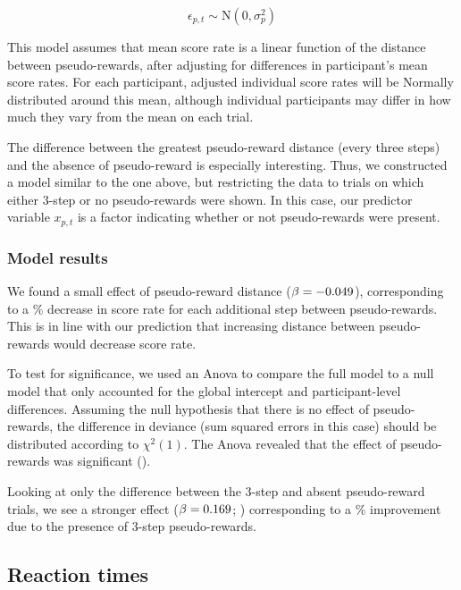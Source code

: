 \documentclass[10pt,letterpaper]{article}
\begin{document}
\begin{equation}
    \epsilon_{p,t} \sim \text{N}(0, \sigma^2_p)
\end{equation}

This model assumes that mean score rate is a linear function of the distance between pseudo-rewards, after adjusting for differences in participant's mean score rates. For each participant, adjusted individual score rates will be Normally distributed around this mean, although individual participants may differ in how much they vary from the mean on each trial.

The difference between the greatest pseudo-reward distance (every three steps) and the absence of pseudo-reward is especially interesting. Thus, we constructed a model similar to the one above, but restricting the data to trials on which either 3-step or no pseudo-rewards were shown. In this case, our predictor variable $x_{p,t}$ is a factor indicating whether or not pseudo-rewards were present.


\subsubsection{Model results} %

We found a small effect of pseudo-reward distance ($\beta = -0.049$), corresponding to a \WorsenRate\% decrease in score rate for each additional step between pseudo-rewards. This is in line with our prediction that increasing distance between pseudo-rewards would decrease score rate.

To test for significance, we used an Anova to compare the full model to a null model that only accounted for the global intercept and participant-level differences. Assuming the null hypothesis that there is no effect of pseudo-rewards, the difference in deviance (sum squared errors in this case) should be distributed according to $\chi^2(1)$. The Anova revealed that the effect of pseudo-rewards was significant (\AovRateFull).

Looking at only the difference between the 3-step and absent pseudo-reward trials, we see a stronger effect ($\beta = 0.169$; \AovThreeFull) corresponding to a \ImprovementThree\% improvement due to the presence of 3-step pseudo-rewards. 


\subsection{Reaction times}\label{planning-time}
\end{document}
